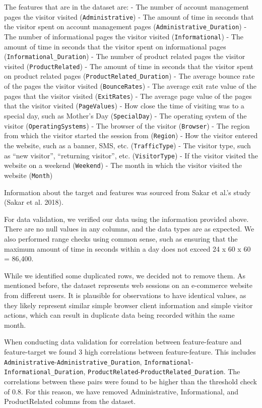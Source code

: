 \documentclass[
  letterpaper,
  DIV=11,
  numbers=noendperiod]{scrartcl}
\begin{document}
The features that are in the dataset are: - The number of account
management pages the visitor visited (\texttt{Administrative}) - The
amount of time in seconds that the visitor spent on account management
pages (\texttt{Administrative\_Duration}) - The number of informational
pages the visitor visited (\texttt{Informational}) - The amount of time
in seconds that the visitor spent on informational pages
(\texttt{Informational\_Duration}) - The number of product related pages
the visitor visited (\texttt{ProductRelated}) - The amount of time in
seconds that the visitor spent on product related pages
(\texttt{ProductRelated\_Duration}) - The average bounce rate of the
pages the visitor visited (\texttt{BounceRates}) - The average exit rate
value of the pages that the visitor visited (\texttt{ExitRates}) - The
average page value of the pages that the visitor visited
(\texttt{PageValues}) - How close the time of visiting was to a special
day, such as Mother's Day (\texttt{SpecialDay}) - The operating system
of the visitor (\texttt{OperatingSystems}) - The browser of the visitor
(\texttt{Browser}) - The region from which the visitor started the
session from (\texttt{Region}) - How the visitor entered the website,
such as a banner, SMS, etc. (\texttt{TrafficType}) - The visitor type,
such as ``new visitor'', ``returning visitor'', etc.
(\texttt{VisitorType}) - If the visitor visited the website on a weekend
(\texttt{Weekend}) - The month in which the visitor visited the website
(\texttt{Month})

Information about the target and features was sourced from Sakar et
al.'s study (Sakar et al. 2018).

For data validation, we verified our data using the information provided
above. There are no null values in any columns, and the data types are
as expected. We also performed range checks using common sense, such as
ensuring that the maximum amount of time in seconds within a day does
not exceed 24 x 60 x 60 = 86,400.

While we identified some duplicated rows, we decided not to remove them.
As mentioned before, the dataset represents web sessions on an
e-commerce website from different users. It is plausible for
observations to have identical values, as they likely represent similar
simple browser client information and simple visitor actions, which can
result in duplicate data being recorded within the same month.

When conducting data validation for correlation between feature-feature
and feature-target we found 3 high correlations between feature-feature.
This includes \texttt{Administrative}-\texttt{Administrative\_Duration},
\texttt{Informational}-\texttt{Informational\_Duration},
\texttt{ProductRelated}-\texttt{ProductRelated\_Duration}. The
correlations between these pairs were found to be higher than the
threshold check of 0.8. For this reason, we have removed Administrative,
Informational, and ProductRelated columns from the dataset.
\end{document}
